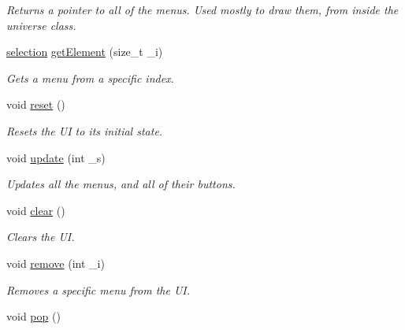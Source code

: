 \begin{DoxyCompactItemize}
\begin{DoxyCompactList}\small\item\em Returns a pointer to all of the menus. Used mostly to draw them, from inside the universe class. \end{DoxyCompactList}\item 
\hyperlink{classui_1_1selection}{selection} \hyperlink{classui_1_1user_interface_a28fb182517232a8b60b594fb4c42fa04}{get\-Element} (size\-\_\-t \-\_\-i)
\begin{DoxyCompactList}\small\item\em Gets a menu from a specific index. \end{DoxyCompactList}\item 
\hypertarget{classui_1_1user_interface_a353bf7f2156f4a6fa4875c5a787508ca}{void \hyperlink{classui_1_1user_interface_a353bf7f2156f4a6fa4875c5a787508ca}{reset} ()}\label{classui_1_1user_interface_a353bf7f2156f4a6fa4875c5a787508ca}

\begin{DoxyCompactList}\small\item\em Resets the U\-I to its initial state. \end{DoxyCompactList}\item 
void \hyperlink{classui_1_1user_interface_a6c9107d3d83a92f3a94c0ca791656598}{update} (int \-\_\-s)
\begin{DoxyCompactList}\small\item\em Updates all the menus, and all of their buttons. \end{DoxyCompactList}\item 
\hypertarget{classui_1_1user_interface_a0b4cdf1e84cbd2ceca29306d2b6ab091}{void \hyperlink{classui_1_1user_interface_a0b4cdf1e84cbd2ceca29306d2b6ab091}{clear} ()}\label{classui_1_1user_interface_a0b4cdf1e84cbd2ceca29306d2b6ab091}

\begin{DoxyCompactList}\small\item\em Clears the U\-I. \end{DoxyCompactList}\item 
void \hyperlink{classui_1_1user_interface_a816b0cfecbb77b2f44fbca923486b91c}{remove} (int \-\_\-i)
\begin{DoxyCompactList}\small\item\em Removes a specific menu from the U\-I. \end{DoxyCompactList}\item 
\hypertarget{classui_1_1user_interface_ae847bb6c29be69d12ec77faa3bc45d43}{void \hyperlink{classui_1_1user_interface_ae847bb6c29be69d12ec77faa3bc45d43}{pop} ()}\label{classui_1_1user_interface_ae847bb6c29be69d12ec77faa3bc45d43}


\end{DoxyCompactItemize}
